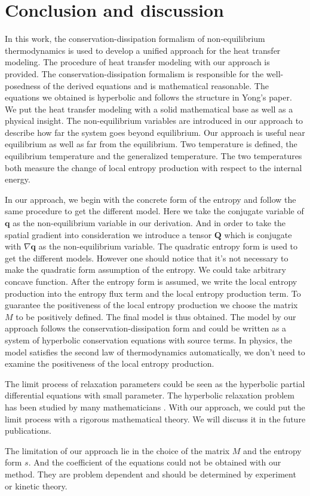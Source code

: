 \documentclass[a4paper]{article}
\begin{document}
\section{Conclusion and discussion}
In this work, the conservation-dissipation formalism of non-equilibrium thermodynamics is used to develop a unified approach for the heat transfer modeling. The procedure of heat transfer modeling with our approach is provided. The conservation-dissipation formalism is responsible for the well-posedness of the derived equations and is mathematical reasonable. The equations we obtained is hyperbolic and follows the structure in Yong's paper.\cite{yong2008interesting} We put the heat transfer modeling with a solid mathematical base as well as a physical insight. The non-equilibrium variables are introduced in our approach to describe how far the system goes beyond equilibrium. Our approach is useful near equilibrium as well as far from the equilibrium. Two temperature is defined, the equilibrium temperature and the generalized temperature. The two temperatures both measure the change of local entropy production with respect to the internal energy. 

In our approach, we begin with the concrete form of the entropy and follow the same procedure to get the different model. Here we take the conjugate variable of $\mathbf{q}$ as the non-equilibrium variable in our derivation. And in order to take the spatial gradient into consideration we introduce a tensor $\mathbf{Q}$ which is conjugate with $\nabla \mathbf{q}$ as the non-equilibrium variable. The quadratic entropy form is used to get the different models. However one should notice that it's not necessary to make the quadratic form assumption of the entropy. We could take arbitrary concave function. After the entropy form is assumed, we write the local entropy production into the entropy flux term and the local entropy production term. To guarantee the positiveness of the local entropy production we choose the matrix $M$ to be positively defined. The final model is thus obtained. The model by our approach follows the conservation-dissipation form and could be written as a system of hyperbolic conservation equations with source terms. In physics, the model satisfies the second law of thermodynamics automatically, we don't need to examine the positiveness of the local entropy production.

The limit process of relaxation parameters could be seen as the hyperbolic partial differential equations with small parameter. The hyperbolic relaxation problem has been studied by many mathematicians \cite{yong2001basic,chen1994hyperbolic}. With our approach, we could put the limit process with a rigorous mathematical theory. We will discuss it in the future publications.

The limitation of our approach lie in the choice of the matrix $M$ and the entropy form $s$. And the coefficient of the equations could not be obtained with our method. They are problem dependent and should be determined by experiment or kinetic theory.


{}

\end{document}
